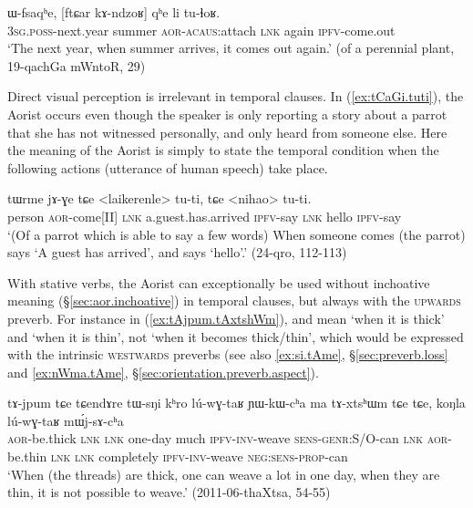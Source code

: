 \begin{exe}
\ex \label{ex:ftCar.kAndzoR.tulhoR}
 \gll ɯ-fsaqʰe, [ftɕar kɤ-ndzoʁ] qʰe li tu-ɬoʁ. \\
 \textsc{3sg}.\textsc{poss}-next.year summer \textsc{aor}-\textsc{acaus}:attach \textsc{lnk} again \textsc{ipfv}-come.out \\
 \glt `The next year, when summer arrives, it comes out again.' (of a perennial plant, 19-qachGa mWntoR, 29)
\end{exe}

Direct visual perception is irrelevant in temporal clauses. In (\ref{ex:tCaGi.tuti}), the Aorist  occurs even though the speaker is only reporting a story about a parrot that she has not witnessed personally, and only heard from someone else. Here the meaning of the Aorist is simply to state the temporal condition when the following actions (utterance of human speech) take place.

\begin{exe}
\ex \label{ex:tCaGi.tuti}
 \gll tɯrme jɤ-ɣe tɕe <laikerenle> tu-ti, tɕe <nihao>  tu-ti. \\
 person \textsc{aor}-come[II] \textsc{lnk} a.guest.has.arrived \textsc{ipfv}-say \textsc{lnk} hello \textsc{ipfv}-say  \\
 \glt `(Of a parrot which is able to say a few words) When someone comes (the parrot) says `A guest has arrived', and says `hello'.' (24-qro, 112-113)
\end{exe}

With stative verbs, the Aorist can exceptionally be used without inchoative meaning (§\ref{sec:aor.inchoative}) in temporal clauses, but always with the \textsc{upwards}  preverb. For instance in (\ref{ex:tAjpum.tAxtshWm}),  and  mean `when it is thick' and `when it is thin', not `when it becomes thick/thin', which would be expressed with the intrinsic \textsc{westwards} preverbs (see also \ref{ex:si.tAme}, §\ref{sec:preverb.loss} and \ref{ex:nWma.tAme}, §\ref{sec:orientation.preverb.aspect}). 

\begin{exe}
\ex \label{ex:tAjpum.tAxtshWm}
 \gll tɤ-jpum tɕe tɕendɤre tɯ-sŋi kʰro lú-wɣ-taʁ ɲɯ-kɯ-cʰa ma tɤ-xtsʰɯm tɕe tɕe, koŋla lú-wɣ-taʁ mɯ́j-sɤ-cʰa   \\
 \textsc{aor}-be.thick \textsc{lnk} \textsc{lnk} one-day much \textsc{ipfv}-\textsc{inv}-weave \textsc{sens}-\textsc{genr}:S/O-can \textsc{lnk} \textsc{aor}-be.thin \textsc{lnk} \textsc{lnk} completely \textsc{ipfv}-\textsc{inv}-weave \textsc{neg}:\textsc{sens}-\textsc{prop}-can \\
\glt `When (the threads) are thick, one can weave a lot in one day, when they are thin, it is not possible to weave.' (2011-06-thaXtsa, 54-55)
\end{exe}

